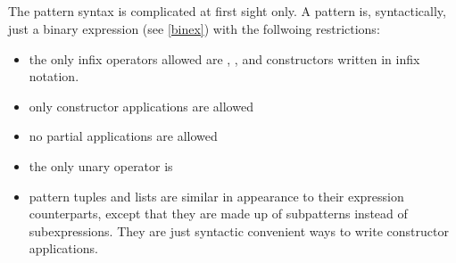 \begin{flushleft}
  \sym{::}  \alt{} \\
   
  \alt {}\\
  \sym{:} 
  \alt {}\\
   
  \alt {} \\
  
  \alt {}\\
 \sym{!}  \alt{}  \\
     
    \alt {} \sym{\{}  \sym{\}}
    \alt {}        
    \alt {}
    \alt \sym{(} \sym{)}    
    \alt \sym{[} \sym{]}           
    \alt \sym{[}  \sym{]} 
    \alt  \sym{(} \sym{,} \sym{)}       
    \alt \sym{(}  \sym{)}\\    

     
    \alt \regex{\_}           \\

 \\
\end{flushleft}

The pattern syntax is complicated at first sight only. A pattern is, syntactically, just a binary expression (see \autoref{binex}) with the follwoing restrictions:
\begin{itemize}
\item the only infix operators allowed are , , \sym{:} and constructors written in infix notation.
\item only constructor applications are allowed
\item no partial applications are allowed
\item the only unary operator is \sym{!}
\item pattern tuples and lists are similar in appearance to their expression counterparts, except that they are made up of subpatterns instead of subexpressions. They are just syntactic convenient ways to write constructor applications.
\end{itemize}

